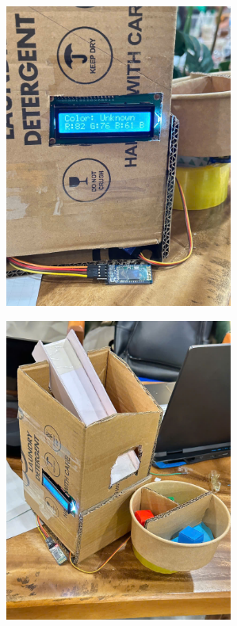 \documentclass[conference, onecolumn]{IEEEtran}
\begin{document}
\begin{center}
    \includegraphics[height=10cm, width=0.7\linewidth\textwidth]{z6445360191814_a188ca7ed7c94401c9256fbc65dc1446.jpg}
    \label{fig1}
    \end{center}
      \vspace{3em}
\noindent
\begin{center}
    \includegraphics[height=10cm, width=0.7\linewidth\textwidth]{z6445360211195_796fd724118b6b7ee89f1521bd4de894.jpg}
    \label{fig1}
    \end{center}
      \vspace{3em}
\noindent
\end{document}
